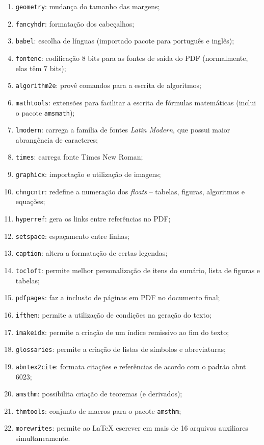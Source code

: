 \documentclass[xindy,rascunho]{fei}
\begin{document}
    \begin{enumerate}
        \item\texttt{geometry}: mudança do tamanho das margens;
        \item\texttt{fancyhdr}: formatação dos cabeçalhos;
        \item\texttt{babel}: escolha de línguas (importado pacote para português e inglês);
        \item\texttt{fontenc}: codificação 8 bits para as fontes de saída do PDF (normalmente, elas têm 7 bits);
        \item\texttt{algorithm2e}: provê comandos para a escrita de algoritmos;
        \item\texttt{mathtools}: extensões para facilitar a escrita de fórmulas matemáticas (inclui o pacote \texttt{amsmath});
        \item\texttt{lmodern}: carrega a família de fontes \emph{Latin Modern}, que possui maior abrangência de caracteres;
        \item\texttt{times}: carrega fonte Times New Roman;
        \item\texttt{graphicx}: importação e utilização de imagens;
        \item\texttt{chngcntr}: redefine a numeração dos \emph{floats} -- tabelas, figuras, algoritmos e equações;
        \item\texttt{hyperref}: gera os links entre referências no PDF;
        \item\texttt{setspace}: espaçamento entre linhas;
        \item\texttt{caption}: altera a formatação de certas legendas;
        \item\texttt{tocloft}: permite melhor personalização de itens do sumário, lista de figuras e tabelas;
        \item\texttt{pdfpages}: faz a inclusão de páginas em PDF no documento final;
        \item\texttt{ifthen}: permite a utilização de condições na geração do texto;
        \item\texttt{imakeidx}: permite a criação de um índice remissivo ao fim do texto;
        \item{}\texttt{glossaries}: permite a criação de listas de símbolos e abreviaturas;
        \item\texttt{abntex2cite}: formata citações e referências de acordo com o padrão \gls{abnt} 6023;
        \item\texttt{amsthm}: possibilita criação de teoremas (e derivados); 
        \item\texttt{thmtools}: conjunto de macros para o pacote \texttt{amsthm};
        \item\texttt{morewrites}:  permite ao LaTeX escrever em mais de 16 arquivos auxiliares simultaneamente.
    \end{enumerate}
\end{document}
